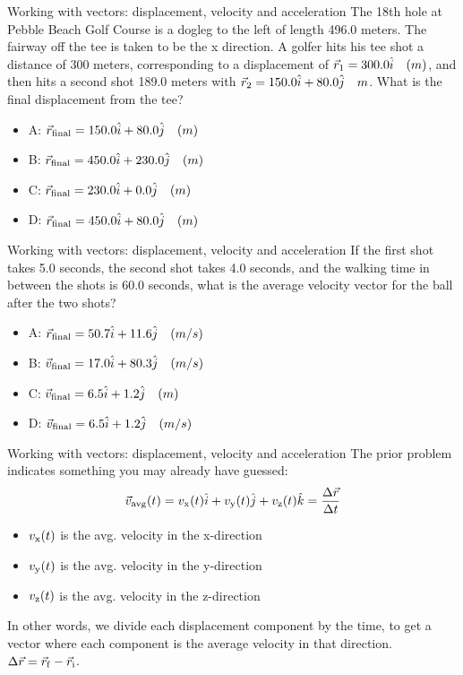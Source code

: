 \documentclass{beamer}
\begin{document}
\begin{frame}{Working with vectors: displacement, velocity and acceleration}
\small
The 18th hole at Pebble Beach Golf Course is a dogleg to the left of length 496.0 meters.  The fairway off the tee is taken to be the x direction.  A golfer hits his tee shot a distance of 300 meters, corresponding to a displacement of $\vec{r}_{\rm 1} = 300.0 \hat{i} \quad (m)$, and then hits a second shot 189.0 meters with $\vec{r}_{\rm 2} = 150.0 \hat{i} + 80.0 \hat{j} \quad m$.  What is the final displacement from the tee?
\begin{itemize}
\item A: $\vec{r}_{\rm final} = 150.0 \hat{i} + 80.0\hat{j}\quad (m)$
\item B: $\vec{r}_{\rm final} = 450.0 \hat{i} + 230.0\hat{j}\quad (m)$
\item C: $\vec{r}_{\rm final} = 230.0 \hat{i} + 0.0\hat{j}\quad (m)$
\item D: $\vec{r}_{\rm final} = 450.0 \hat{i} + 80.0\hat{j}\quad (m)$
\end{itemize}
\end{frame}

\begin{frame}{Working with vectors: displacement, velocity and acceleration}
\small
If the first shot takes 5.0 seconds, the second shot takes 4.0 seconds, and the walking time in between the shots is 60.0 seconds, what is the average velocity vector for the ball after the two shots?
\begin{itemize}
\item A: $\vec{r}_{\rm final} = 50.7 \hat{i} + 11.6\hat{j}\quad (m/s)$
\item B: $\vec{v}_{\rm final} = 17.0 \hat{i} + 80.3\hat{j}\quad (m/s)$
\item C: $\vec{v}_{\rm final} = 6.5 \hat{i} + 1.2\hat{j}\quad (m)$
\item D: $\vec{v}_{\rm final} = 6.5 \hat{i} + 1.2\hat{j}\quad (m/s)$
\end{itemize}
\end{frame}

\begin{frame}{Working with vectors: displacement, velocity and acceleration}
The prior problem indicates something you may already have guessed:
\begin{equation}
\vec{v}_{\rm avg}(t) = v_{\rm x}(t) \hat{i} + v_{\rm y}(t) \hat{j} + v_{\rm z}(t) \hat{k} = \frac{\Delta\vec{r}}{\Delta t}
\label{eq:vel}
\end{equation}
\begin{itemize}
\item $v_{\rm x}(t)$ is the avg. velocity in the x-direction
\item $v_{\rm y}(t)$ is the avg. velocity in the y-direction
\item $v_{\rm z}(t)$ is the avg. velocity in the z-direction
\end{itemize}
In other words, we divide each displacement component by the time, to get a vector where each component is the average velocity in that direction.  $\Delta\vec{r} = \vec{r}_{\rm f} - \vec{r}_{\rm i}$.
\end{frame}
\end{document}
